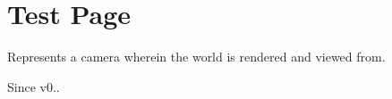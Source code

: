 \chapter{Test Page}
\hypertarget{testpage}{}\label{testpage}
Represents a camera wherein the world is rendered and viewed from.

\begin{DoxySince}{Since}
v0.. 
\end{DoxySince}
